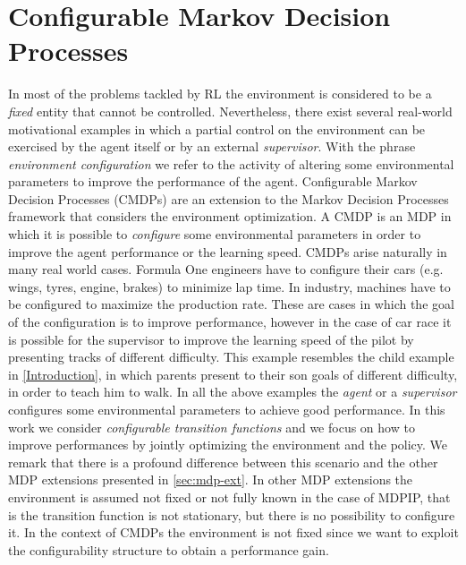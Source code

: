\section{Configurable Markov Decision Processes}\label{sec:cmdp}
In most of the problems tackled by RL the environment is considered to be a \textit{fixed} entity that cannot be controlled. Nevertheless, there exist several real-world motivational examples in which a partial control on the environment can be exercised by the agent itself or by an external \textit{supervisor}. 
With the phrase \textit{environment configuration} we refer to the activity of altering some environmental parameters to improve the performance of the agent. \newline
Configurable Markov Decision Processes (CMDPs) are an extension to the Markov Decision Processes framework that considers the environment optimization. A CMDP is an MDP in which it is possible to \textit{configure} some environmental parameters in order to improve the agent performance or the learning speed. 
CMDPs arise naturally in many real world cases. Formula One engineers have to configure their cars (e.g. wings, tyres, engine, brakes) to minimize lap time. In industry, machines have to be configured to maximize the production rate. 
These are cases in which the goal of the configuration is to improve performance, however in the case of car race it is possible for the supervisor to improve the learning speed of the pilot by presenting tracks of different difficulty. This example resembles the child example in \cref{Introduction}, in which parents present to their son goals of different difficulty, in order to teach him to walk. \newline
 In all the above examples the \textit{agent} or a \textit{supervisor} configures some environmental parameters to achieve good performance. \newline
 In this work we consider \textit{configurable transition functions} and we focus on how to improve performances by jointly optimizing the environment and the policy. \newline
 We remark that there is a profound difference between this scenario and the other MDP extensions presented in \cref{sec:mdp-ext}.
 In other MDP extensions the environment is assumed not fixed or not fully known in the case of MDPIP, that is the transition function is not stationary, but there is no possibility to configure it. In the context of CMDPs the environment is not fixed since we want to exploit the configurability structure to obtain a performance gain. 
 
